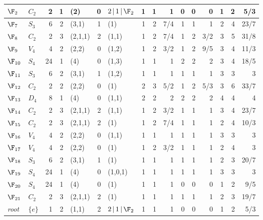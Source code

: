 \begin{landscape}
{\begin{longtable}{@{}l l r r l r l rrr rrr rrr@{}}
\quad$\F_{2}$ & $C_{2}$ & 2 & 1 & (2) & 0 & $2\,|\,1\,|\,\F_{2}$ & 1 & 1 & 1 & 0 & 0 & 0 & 1 & 2 & 5/3 \\
\midrule
\textbf{$\F_{7}$} & $S_{3}$ & 6 & 2 & (3,1) & 1 & (1) & 1 & 2 & 7/4 & 1 & 1 & 1 & 2 & 4 & 23/7 \\
\addlinespace[3pt]
\textbf{$\F_{8}$} & $C_{2}$ & 2 & 3 & (2,1,1) & 2 & (1,1) & 1 & 2 & 7/4 & 1 & 2 & 3/2 & 3 & 5 & 31/8 \\
\addlinespace[3pt]
\textbf{$\F_{9}$} & $V_{4}$ & 4 & 2 & (2,2) & 0 & (1,2) & 1 & 2 & 3/2 & 1 & 2 & 9/5 & 3 & 4 & 11/3 \\
\addlinespace[3pt]
\textbf{$\F_{10}$} & $S_{4}$ & 24 & 1 & (4) & 0 & (1,3) & 1 & 1 & 1 & 2 & 2 & 2 & 3 & 4 & 18/5 \\
\addlinespace[3pt]
\textbf{$\F_{11}$} & $S_{3}$ & 6 & 2 & (3,1) & 1 & (1,2) & 1 & 1 & 1 & 1 & 1 & 1 & 3 & 3 & 3 \\
\addlinespace[3pt]
\textbf{$\F_{12}$} & $C_{2}$ & 2 & 2 & (2,2) & 0 & (1) & 2 & 3 & 5/2 & 1 & 2 & 5/3 & 3 & 6 & 33/7 \\
\addlinespace[3pt]
\textbf{$\F_{13}$} & $D_{4}$ & 8 & 1 & (4) & 0 & (1,1) & 2 & 2 & 2 & 2 & 2 & 2 & 4 & 4 & 4 \\
\addlinespace[3pt]
\textbf{$\F_{14}$} & $C_{2}$ & 2 & 3 & (2,1,1) & 2 & (1,1) & 1 & 2 & 3/2 & 1 & 1 & 1 & 3 & 4 & 23/7 \\
\addlinespace[3pt]
\textbf{$\F_{15}$} & $C_{2}$ & 2 & 3 & (2,1,1) & 2 & (1) & 1 & 2 & 7/4 & 1 & 1 & 1 & 2 & 4 & 10/3 \\
\addlinespace[3pt]
\textbf{$\F_{16}$} & $V_{4}$ & 4 & 2 & (2,2) & 0 & (1,1) & 1 & 1 & 1 & 1 & 1 & 1 & 3 & 3 & 3 \\
\addlinespace[3pt]
\textbf{$\F_{17}$} & $V_{4}$ & 4 & 2 & (2,2) & 0 & (1) & 1 & 2 & 3/2 & 1 & 1 & 1 & 2 & 4 & 3 \\
\addlinespace[3pt]
\textbf{$\F_{18}$} & $S_{3}$ & 6 & 2 & (3,1) & 1 & (1) & 1 & 1 & 1 & 1 & 1 & 1 & 2 & 3 & 20/7 \\
\addlinespace[3pt]
\textbf{$\F_{19}$} & $S_{4}$ & 24 & 1 & (4) & 0 & (1,0,1) & 1 & 1 & 1 & 1 & 1 & 1 & 3 & 3 & 3 \\
\addlinespace[3pt]
\textbf{$\F_{20}$} & $S_{4}$ & 24 & 1 & (4) & 0 & (1) & 1 & 1 & 1 & 0 & 0 & 0 & 1 & 2 & 9/5 \\
\addlinespace[3pt]
\textbf{$\F_{21}$} & $C_{2}$ & 2 & 3 & (2,1,1) & 2 & (1) & 1 & 1 & 1 & 1 & 1 & 1 & 2 & 3 & 19/7 \\
\quad\textit{root} & $\{e\}$ & 1 & 2 & (1,1) & 2 & $2\,|\,1\,|\,\F_{2}$ & 1 & 1 & 1 & 0 & 0 & 0 & 1 & 2 & 5/3 \\

\end{longtable}}
\end{landscape}
